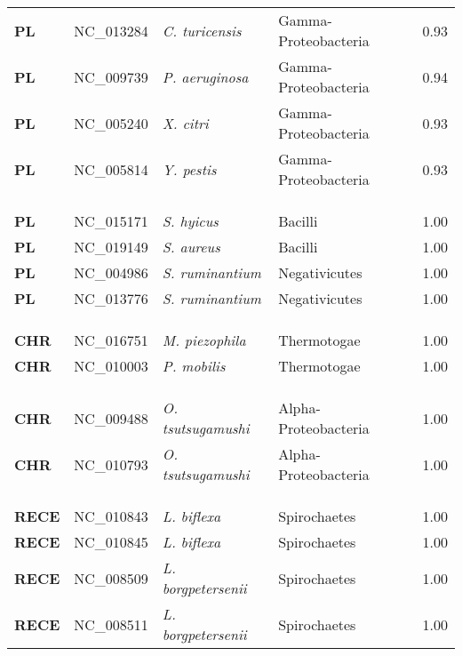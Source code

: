 \begin{adjustwidth}{-3cm}{2cm}
{\begin{supertabular}{>{\bfseries}l|p{0.1\textwidth}p{0.14\textwidth}l|l}
PL & NC\_013284 & \textit{C. turicensis} & Gamma-Proteobacteria & 0.93\\
PL & NC\_009739 & \textit{P. aeruginosa} & Gamma-Proteobacteria & 0.94\\
PL & NC\_005240 & \textit{X. citri} & Gamma-Proteobacteria & 0.93\\
PL & NC\_005814 & \textit{Y. pestis} & Gamma-Proteobacteria & 0.93\\
\\
\\
\hline\\
PL & NC\_015171 & \textit{S. hyicus} & Bacilli & 1.00\\
PL & NC\_019149 & \textit{S. aureus} & Bacilli & 1.00\\
PL & NC\_004986 & \textit{S. ruminantium} & Negativicutes & 1.00\\
PL & NC\_013776 & \textit{S. ruminantium} & Negativicutes & 1.00\\
\\
\\
\hline\\
CHR & NC\_016751 & \textit{M. piezophila} & Thermotogae & 1.00\\
CHR & NC\_010003 & \textit{P. mobilis} & Thermotogae & 1.00\\
\\
\\
\hline\\
CHR & NC\_009488 & \textit{O. tsutsugamushi} & Alpha-Proteobacteria & 1.00\\
CHR & NC\_010793 & \textit{O. tsutsugamushi} & Alpha-Proteobacteria & 1.00\\
\\
\\
\hline\\
RECE & NC\_010843 &  \textit{L. biflexa} & Spirochaetes & 1.00\\
RECE & NC\_010845 &  \textit{L. biflexa} & Spirochaetes & 1.00\\
RECE & NC\_008509 &  \textit{L. borgpetersenii} & Spirochaetes & 1.00\\
RECE & NC\_008511 &  \textit{L. borgpetersenii} & Spirochaetes & 1.00\\

\end{supertabular}}
\end{adjustwidth}
